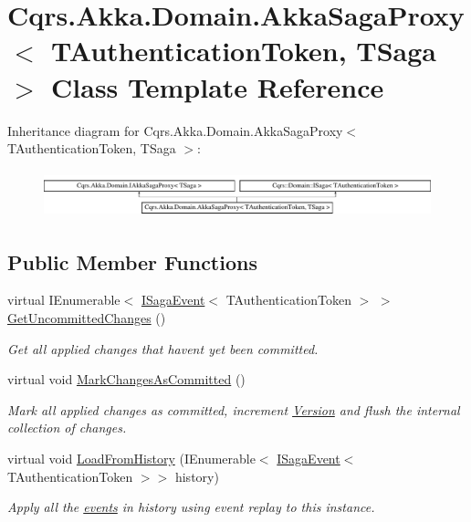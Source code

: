 \hypertarget{classCqrs_1_1Akka_1_1Domain_1_1AkkaSagaProxy}{}\section{Cqrs.\+Akka.\+Domain.\+Akka\+Saga\+Proxy$<$ T\+Authentication\+Token, T\+Saga $>$ Class Template Reference}
\label{classCqrs_1_1Akka_1_1Domain_1_1AkkaSagaProxy}
Inheritance diagram for Cqrs.\+Akka.\+Domain.\+Akka\+Saga\+Proxy$<$ T\+Authentication\+Token, T\+Saga $>$\+:\begin{figure}[H]
\begin{center}
\leavevmode
\includegraphics[height=1.372549cm]{classCqrs_1_1Akka_1_1Domain_1_1AkkaSagaProxy}
\end{center}
\end{figure}
\subsection*{Public Member Functions}
\begin{DoxyCompactItemize}
\item 
virtual I\+Enumerable$<$ \hyperlink{interfaceCqrs_1_1Events_1_1ISagaEvent}{I\+Saga\+Event}$<$ T\+Authentication\+Token $>$ $>$ \hyperlink{classCqrs_1_1Akka_1_1Domain_1_1AkkaSagaProxy_a8cad3415bc5474a01bfdb2db3a852ea5_a8cad3415bc5474a01bfdb2db3a852ea5}{Get\+Uncommitted\+Changes} ()
\begin{DoxyCompactList}\small\item\em Get all applied changes that haven\textquotesingle{}t yet been committed. \end{DoxyCompactList}\item 
virtual void \hyperlink{classCqrs_1_1Akka_1_1Domain_1_1AkkaSagaProxy_a5a5c012bc0f7f957b8bd2298956ca9ae_a5a5c012bc0f7f957b8bd2298956ca9ae}{Mark\+Changes\+As\+Committed} ()
\begin{DoxyCompactList}\small\item\em Mark all applied changes as committed, increment \hyperlink{classCqrs_1_1Akka_1_1Domain_1_1AkkaSagaProxy_ab6272400fe5c6227a11cf5c93f752d4d_ab6272400fe5c6227a11cf5c93f752d4d}{Version} and flush the internal collection of changes. \end{DoxyCompactList}\item 
virtual void \hyperlink{classCqrs_1_1Akka_1_1Domain_1_1AkkaSagaProxy_a21b69799b046c1fcdf5b2443699dee0c_a21b69799b046c1fcdf5b2443699dee0c}{Load\+From\+History} (I\+Enumerable$<$ \hyperlink{interfaceCqrs_1_1Events_1_1ISagaEvent}{I\+Saga\+Event}$<$ T\+Authentication\+Token $>$$>$ history)
\begin{DoxyCompactList}\small\item\em Apply all the \hyperlink{}{events} in {\itshape history}  using event replay to this instance. \end{DoxyCompactList}\end{DoxyCompactItemize}
